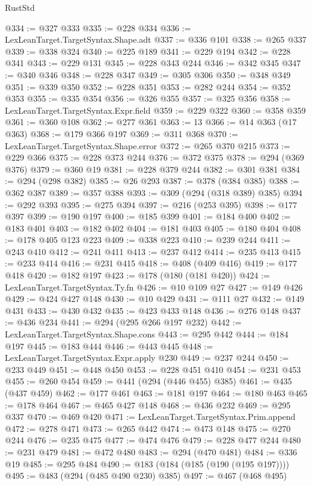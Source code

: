 \begin{lexlean}{RustStd}
\begin{coremodule}
@334 := @327 @333
@335 := @228 @334
@336 := LexLeanTarget.TargetSyntax.Shape.adt
@337 := @336 @101
@338 := @265 @337
@339 := @338 @324
@340 := @225 @189
@341 := @229 @194
@342 := @228 @341
@343 := @229 @131
@345 := @228 @343 @244
@346 := @342 @345
@347 := @340 @346
@348 := @228 @347
@349 := @305 @306
@350 := @348 @349
@351 := @339 @350
@352 := @228 @351
@353 := @282 @244
@354 := @352 @353
@355 := @335 @354
@356 := @326 @355
@357 := @325 @356
@358 := LexLeanTarget.TargetSyntax.Expr.field
@359 := @229 @322
@360 := @358 @359
@361 := @360 @108
@362 := @277 @361
@363 := 13
@366 := @14 @363 (@17 @363)
@368 := @179 @366 @197
@369 := @311 @368
@370 := LexLeanTarget.TargetSyntax.Shape.error
@372 := @265 @370 @215
@373 := @229 @366
@375 := @228 @373 @244
@376 := @372 @375
@378 := @294 (@369 @376)
@379 := @360 @19
@381 := @228 @379 @244
@382 := @301 @381
@384 := @294 (@298 @382)
@385 := @26 @293
@387 := @378 (@384 @385)
@388 := @362 @387
@389 := @357 @388
@393 := @309 (@294 (@318 @389) @385)
@394 := @292 @393
@395 := @275 @394
@397 := @216 (@253 @395)
@398 := @177 @397
@399 := @190 @197
@400 := @185 @399
@401 := @184 @400
@402 := @183 @401
@403 := @182 @402
@404 := @181 @403
@405 := @180 @404
@408 := @178 @405 @123 @223
@409 := @338 @223
@410 := @239 @244
@411 := @243 @410
@412 := @241 @411
@413 := @237 @412
@414 := @235 @413
@415 := @233 @414
@416 := @231 @415
@418 := @408 (@409 @416)
@419 := @177 @418
@420 := @182 @197
@423 := @178 (@180 (@181 @420))
@424 := LexLeanTarget.TargetSyntax.Ty.fn
@426 := @10 @109 @27
@427 := @149 @426
@429 := @424 @427 @148
@430 := @10 @429
@431 := @111 @27
@432 := @149 @431
@433 := @430 @432
@435 := @423 @433 @148
@436 := @276 @148
@437 := @436 @234
@441 := @294 (@295 @266 @197 @232)
@442 := LexLeanTarget.TargetSyntax.Shape.cons
@443 := @295 @442
@444 := @184 @197
@445 := @183 @444
@446 := @443 @445
@448 := LexLeanTarget.TargetSyntax.Expr.apply @230
@449 := @237 @244
@450 := @233 @449
@451 := @448 @450
@453 := @228 @451 @410
@454 := @231 @453
@455 := @260 @454
@459 := @441 (@294 (@446 @455) @385)
@461 := @435 (@437 @459)
@462 := @177 @461
@463 := @181 @197
@464 := @180 @463
@465 := @178 @464
@467 := @465 @427 @148
@468 := @436 @232
@469 := @295 @337
@470 := @469 @420
@471 := LexLeanTarget.TargetSyntax.Prim.append
@472 := @278 @471
@473 := @265 @442
@474 := @473 @148
@475 := @270 @244
@476 := @235 @475
@477 := @474 @476
@479 := @228 @477 @244
@480 := @231 @479
@481 := @472 @480
@483 := @294 (@470 @481)
@484 := @336 @19
@485 := @295 @484
@490 := @183 (@184 (@185 (@190 (@195 @197))))
@495 := @483 (@294 (@485 @490 @230) @385)
@497 := @467 (@468 @495)

\end{coremodule}
\end{lexlean}
